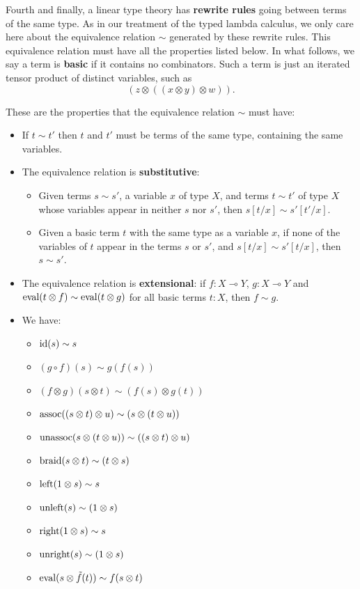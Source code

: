 \documentclass[12pt,twoside,openright]{report}
\newcommand{\lhom}{\multimap}
\newcommand{\tensor}{\otimes}
\newcommand{\Id}{{\rm id}}
\newcommand{\eval}{{\rm eval}}
\newcommand{\assoc}{{\rm assoc}}
\newcommand{\unassoc}{{\rm unassoc}}
\newcommand{\braid}{{\rm braid}}
\newcommand{\Left}{{\rm left}}
\newcommand{\Right}{{\rm right}}
\newcommand{\unright}{{\rm unright}}
\newcommand{\unleft}{{\rm unleft}}
\begin{document}
Fourth and finally, a linear type theory has {\bf rewrite rules} going between terms of the same type.  As in our treatment of the typed lambda calculus, we only care here about the equivalence relation $\sim$ generated by these rewrite rules.  This equivalence relation must have all the properties listed below.  In what follows, we say a term is {\bf basic} if it contains no combinators.  Such a term is just an iterated tensor product of distinct variables, such as
\[              (z \tensor ((x \tensor y) \tensor w)) .\]

These are the properties that the equivalence relation $\sim$ must have:
\begin{itemize}
\item If $t \sim t'$ then $t$ and $t'$ must be terms of the same type, containing the same variables.
\item The equivalence relation is {\bf substitutive}: 
\begin{itemize} 
\item Given terms $s \sim s'$, a variable $x$ of type $X$, and terms $t \sim t'$ of type $X$ whose variables appear in neither $s$ nor $s'$, then $s[t/x] \sim s'[t'/x]$.  
\item Given a basic term $t$ with the same type as a variable
$x$, if none of the variables of $t$ appear in the terms
$s$ or $s'$, and $s[t/x] \sim s'[t/x]$, then $s \sim s'$.
\end{itemize}
\item The equivalence relation is {\bf extensional}: if 
$f : X \lhom Y$, $g: X \lhom Y$ and 
$\eval(t \tensor f) \sim \eval(t \tensor g)$ for all basic terms 
$t:X$, then $f \sim g$.  
\item We have:
    \begin{itemize}
      \item $\Id(s) \sim s$
      \item $(g \circ f)(s) \sim g(f(s))$
      \item $(f \tensor g)(s \tensor t) \sim (f(s)\tensor g(t))$
      \item $\assoc((s \tensor t) \tensor u) 
             \sim (s \tensor (t \tensor u))$
      \item $\unassoc(s \tensor (t \tensor u))
             \sim ((s \tensor t) \tensor u)$
      \item $\braid(s \tensor t) \sim (t \tensor s)$
      \item $\Left(1 \tensor s) \sim s$
      \item $\unleft(s) \sim (1 \tensor s)$
      \item $\Right(1 \tensor s) \sim s$
      \item $\unright(s) \sim (1 \tensor s)$
      \item $\eval(s \tensor \tilde{f}(t)) \sim f(s \tensor t)$
    \end{itemize}
\end{itemize}
\end{document}
